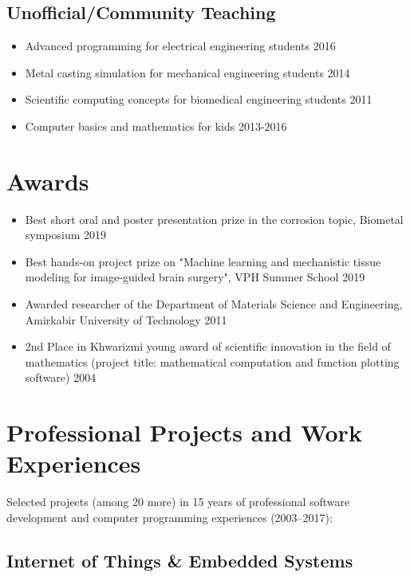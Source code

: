 \documentclass{cv}
\begin{document}
\subsection{Unofficial/Community Teaching}

\begin{itemize}
\item
Advanced programming for electrical engineering students \hfill 2016
\item
Metal casting simulation for mechanical engineering students \hfill 2014
\item
Scientific computing concepts for biomedical engineering students \hfill 2011
\item
Computer basics and mathematics for kids \hfill 2013-2016
\end{itemize}


\section{Awards}

\begin{itemize}
\item
Best short oral and poster presentation prize in the corrosion topic, Biometal symposium \hfill 2019
\item
Best hands-on project prize on "Machine learning and mechanistic tissue modeling for image-guided brain surgery", VPH Summer School \hfill 2019
\item
Awarded researcher of the Department of Materials Science and Engineering, Amirkabir University of Technology \hfill 2011
\item
2nd Place in Khwarizmi young award of scientific innovation in the field of mathematics (project title: mathematical computation and function plotting software) \hfill 2004
\end{itemize}



\section{Professional Projects and Work Experiences}


Selected projects (among 20 more) in 15 years of professional software development and computer programming experiences (2003--2017):

\subsection{Internet of Things \& Embedded Systems}
\end{document}

